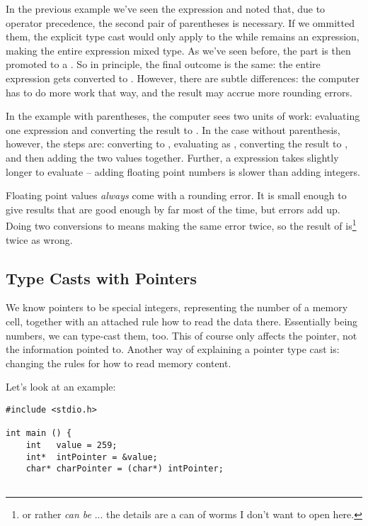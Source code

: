 {In the previous example we've seen the expression  and noted that, due to operator precedence, the second pair of parentheses is necessary. If we ommitted them, the explicit type cast would only apply to the  while  remains an  expression, making the entire expression mixed type. As we've seen before, the  part is then promoted to a . So in principle, the final outcome is the same: the entire expression gets converted to . However, there are subtle differences: the computer has to do more work that way, and the result may accrue more rounding errors.

In the example with parentheses, the computer sees two units of work: evaluating one  expression and converting the result to . In the case without parenthesis, however, the steps are: converting  to , evaluating  as , converting the result to , and then adding the two  values together. Further, a  expression takes slightly longer to evaluate -- adding floating point numbers is slower than adding integers.

Floating point values \emph{always} come with a rounding error. It is small enough to give results that are good enough by far most of the time, but errors add up. Doing two conversions to  means making the same error twice, so the result of  is\footnote{or rather \emph{can be} ... the details are a can of worms I don't want to open here.} twice as wrong.


\subsection{Type Casts with Pointers}
We know pointers to be special integers, representing the number of a memory cell, together with an attached rule how to read the data there. Essentially being numbers, we can type-cast them, too. This of course only affects the pointer, not the information pointed to. Another way of explaining a pointer type cast is: changing the rules for how to read memory content.

Let's look at an example:
\begin{codebox}
\begin{verbatim}
#include <stdio.h>

int main () {
    int   value = 259;
    int*  intPointer = &value;
    char* charPointer = (char*) intPointer;


\end{verbatim}
\end{codebox}}
